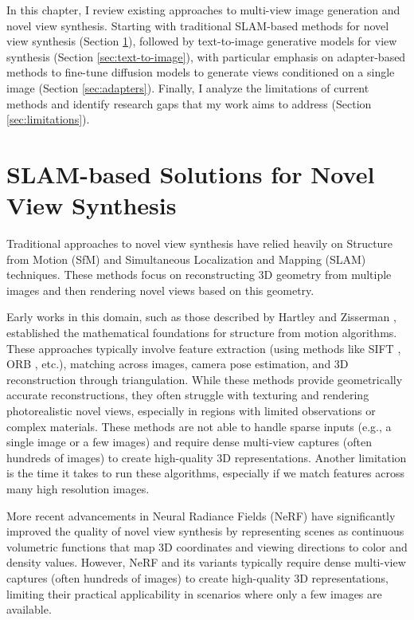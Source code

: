 \label{chapter:related}

In this chapter, I review existing approaches to multi-view image generation and novel view synthesis. Starting with traditional SLAM-based methods for novel view synthesis (Section \ref{sec:slam}), followed by text-to-image generative models for view synthesis (Section \ref{sec:text-to-image}), with particular emphasis on adapter-based methods to fine-tune diffusion models to generate views conditioned on a single image (Section \ref{sec:adapters}). Finally, I analyze the limitations of current methods and identify research gaps that my work aims to address (Section \ref{sec:limitations}).

\section{SLAM-based Solutions for Novel View Synthesis}\label{sec:slam}

Traditional approaches to novel view synthesis have relied heavily on Structure from Motion (SfM) and Simultaneous Localization and Mapping (SLAM) techniques. These methods focus on reconstructing 3D geometry from multiple images and then rendering novel views based on this geometry.

Early works in this domain, such as those described by Hartley and Zisserman \cite{multipleviewgeometry}, established the mathematical foundations for structure from motion algorithms. These approaches typically involve feature extraction (using methods like SIFT \cite{sift}, ORB \cite{orb}, etc.), matching across images, camera pose estimation, and 3D reconstruction through triangulation. While these methods provide geometrically accurate reconstructions, they often struggle with texturing and rendering photorealistic novel views, especially in regions with limited observations or complex materials. 
These methods are not able to handle sparse inputs (e.g., a single image or a few images) and require dense multi-view captures (often hundreds of images) to create high-quality 3D representations. Another limitation is the time it takes to run these algorithms, especially if we match features across many high resolution images.

More recent advancements in Neural Radiance Fields (NeRF) \cite{nerf} have significantly improved the quality of novel view synthesis by representing scenes as continuous volumetric functions that map 3D coordinates and viewing directions to color and density values. However, NeRF and its variants typically require dense multi-view captures (often hundreds of images) to create high-quality 3D representations, limiting their practical applicability in scenarios where only a few images are available.


